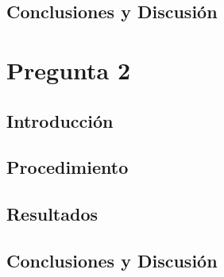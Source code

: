 \documentclass[a4paper, 11pt, spanish]{article}
\begin{document}
\subsection{Conclusiones y Discusi\'on}




\pagebreak
\section{Pregunta 2}

\subsection{Introducci\'on}

\subsection{Procedimiento}

\subsection{Resultados}

\subsection{Conclusiones y Discusi\'on}
\end{document}
